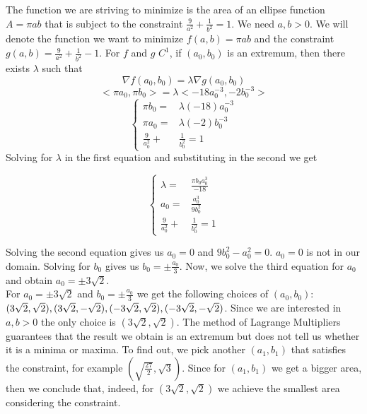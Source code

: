 \documentclass[]{article}
\begin{document}
The function we are striving to minimize is the area of an ellipse function $A=\pi ab$ that is subject to the constraint
$\frac{9}{a^2} + \frac{1}{b^2} = 1$. We need $a,b>0$. We will denote the function we want to minimize $f(a,b)=\pi ab$
and the constraint $g(a,b)=\frac{9}{a^2} + \frac{1}{b^2}-1$. For $f$ and $g$ $C^1$, if $(a_0,b_0)$ is an extremum, then there exists $\lambda$ such that
$$    
    \nabla f(a_0,b_0) = \lambda \nabla g(a_0,b_0)
$$
$$
    <\pi a_0, \pi b_0> = \lambda <-18a_0^{-3}, -2b_0^{-3}>
$$
\begin{equation*}
    \left\{
    \begin{alignedat}{3}
        \pi b_0= &\lambda(-18)a_0^{-3} \\
        \pi a_0= &\lambda (-2)b_0^{-3} \\
        \frac{9}{a_0^2} +& \frac{1}{b_0^2} = 1
    \end{alignedat}
    \right.
\end{equation*}
Solving for $\lambda$ in the first equation and substituting in the second we get

\begin{equation*}
    \left\{
    \begin{alignedat}{3}
        \lambda= &\frac{\pi b_0a_0^{3}}{-18} \\
        a_0= & \frac{a_0^3}{9b_0^2} \\
        \frac{9}{a_0^2} +& \frac{1}{b_0^2} = 1
    \end{alignedat}
    \right.
\end{equation*}

Solving the second equation gives us $a_0=0$ and $9b_0^2-a_0^2=0$. $a_0=0$ is not in our domain. Solving for $b_0$ gives us $b_0=\pm \frac{a_0}{3}$.
Now, we solve the third equation for $a_0$ and obtain $a_0=\pm 3\sqrt{2}$.\\
For $a_0=\pm 3\sqrt{2}$ and $b_0=\pm \frac{a_0}{3}$ we get the following choices of $(a_0,b_0)$: $(3\sqrt{2}, \sqrt{2}),\\
(3\sqrt{2}, -\sqrt{2}), (-3\sqrt{2}, \sqrt{2}), (-3\sqrt{2}, -\sqrt{2})$.
Since we are interested in $a,b>0$ the only choice is $(3\sqrt{2}, \sqrt{2})$.
The method of Lagrange Multipliers guarantees that the result we obtain is an extremum but does not tell us
whether it is a minima or maxima. To find out, we pick another $(a_1,b_1)$ that satisfies the constraint, for example $(\sqrt{\frac{27}{2}},\sqrt{3})$. Since for $(a_1,b_1)$ we get a bigger area, then we conclude that, indeed, for $(3\sqrt{2}, \sqrt{2})$
we achieve the smallest area considering the constraint.
\end{document}
